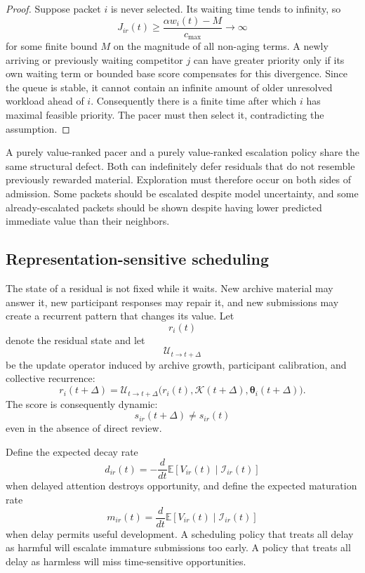 \documentclass[11pt]{article}
\theoremstyle{definition}
\newcommand{\E}{\mathbb{E}}
\newcommand{\K}{\mathcal{K}}
\newcommand{\thetaState}{\boldsymbol{\theta}}
\begin{document}
\begin{proof}
Suppose packet \(i\) is never selected. Its waiting time tends to infinity, so
\[
J_{ir}(t)
\geq
\frac{\alpha w_i(t)-M}{c_{\max}}
\longrightarrow\infty
\]
for some finite bound \(M\) on the magnitude of all non-aging terms. A newly arriving or previously waiting competitor \(j\) can have greater priority only if its own waiting term or bounded base score compensates for this divergence. Since the queue is stable, it cannot contain an infinite amount of older unresolved workload ahead of \(i\). Consequently there is a finite time after which \(i\) has maximal feasible priority. The pacer must then select it, contradicting the assumption.
\end{proof}

A purely value-ranked pacer and a purely value-ranked escalation policy share the same structural defect. Both can indefinitely defer residuals that do not resemble previously rewarded material. Exploration must therefore occur on both sides of admission. Some packets should be escalated despite model uncertainty, and some already-escalated packets should be shown despite having lower predicted immediate value than their neighbors.

\subsection{Representation-sensitive scheduling}

The state of a residual is not fixed while it waits. New archive material may answer it, new participant responses may repair it, and new submissions may create a recurrent pattern that changes its value. Let
\[
r_i(t)
\]
denote the residual state and let
\[
\mathcal{U}_{t\to t+\Delta}
\]
be the update operator induced by archive growth, participant calibration, and collective recurrence:
\[
r_i(t+\Delta)
=
\mathcal{U}_{t\to t+\Delta}
\bigl(
r_i(t),
\K(t+\Delta),
\thetaState_i(t+\Delta)
\bigr).
\]
The score is consequently dynamic:
\[
s_{ir}(t+\Delta)
\neq
s_{ir}(t)
\]
even in the absence of direct review.

Define the expected decay rate
\[
d_{ir}(t)
=
-
\frac{d}{dt}
\E[V_{ir}(t)\mid\mathscr{I}_{ir}(t)]
\]
when delayed attention destroys opportunity, and define the expected maturation rate
\[
m_{ir}(t)
=
\frac{d}{dt}
\E[V_{ir}(t)\mid\mathscr{I}_{ir}(t)]
\]
when delay permits useful development. A scheduling policy that treats all delay as harmful will escalate immature submissions too early. A policy that treats all delay as harmless will miss time-sensitive opportunities.
\end{document}
